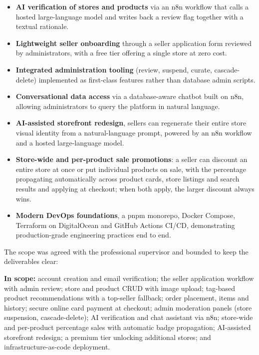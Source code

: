 \begin{itemize}[leftmargin=*,itemsep=2pt]
  \item \textbf{AI verification of stores and products} via an n8n
        workflow that calls a hosted large-language model and writes
        back a review flag together with a textual rationale.
  \item \textbf{Lightweight seller onboarding} through a seller
        application form reviewed by administrators, with a free tier
        offering a single store at zero cost.
  \item \textbf{Integrated administration tooling} (review, suspend,
        curate, cascade-delete) implemented as first-class features
        rather than database admin scripts.
  \item \textbf{Conversational data access} via a database-aware
        chatbot built on n8n, allowing administrators to query the
        platform in natural language.
  \item \textbf{AI-assisted storefront redesign}, sellers can
        regenerate their entire store visual identity from a
        natural-language prompt, powered by an n8n workflow and a hosted
        large-language model.
  \item \textbf{Store-wide and per-product sale promotions}: a seller can
        discount an entire store at once or put individual products on
        sale, with the percentage propagating automatically across
        product cards, store listings and search results and applying at
        checkout; when both apply, the larger discount always wins.
  \item \textbf{Modern DevOps foundations}, a pnpm monorepo, Docker
        Compose, Terraform on DigitalOcean and GitHub Actions CI/CD, 
        demonstrating production-grade engineering practices end to end.
\end{itemize}

The scope was agreed with the professional supervisor and bounded to
keep the deliverables clear:

\medskip
\noindent\textbf{In scope:} account creation and email verification;
the seller application workflow with admin review; store and product
CRUD with image upload; tag-based product recommendations with a
top-seller fallback; order placement, items and history; secure online
card payment at checkout; admin
moderation panels (store suspension, cascade-delete); AI verification
and chat assistant via n8n; store-wide and per-product percentage sales
with automatic badge propagation; AI-assisted storefront redesign; a premium tier
unlocking additional stores; and infrastructure-as-code deployment.

